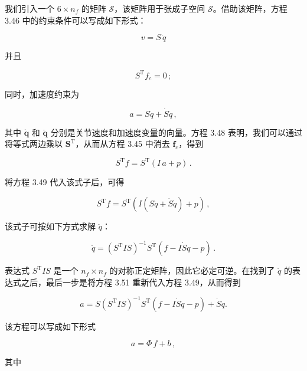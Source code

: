 \documentclass[10pt,a4paper]{book}
\theoremstyle{thmstyle} %
\theoremstyle{defstyle} %
\theoremstyle{prostyle} %
\begin{document}
我们引入一个 $6 \times n_{f}$ 的矩阵 $\mathcal{S}$，该矩阵用于张成子空间 $\mathcal{S}$。借助该矩阵，方程 3.46 中的约束条件可以写成如下形式：



$$
v = S \, \dot { q }
$$



并且



$$
S ^{\mathrm { T} } f _ { c } = 0 \, ;
$$



同时，加速度约束为



$$
a = S \ddot { q } + \dot { S } \dot { q } \, ,
$$



其中 $\dot{\boldsymbol{q}}$ 和 $\ddot{\boldsymbol{q}}$ 分别是关节速度和加速度变量的向量。方程 3.48 表明，我们可以通过将等式两边乘以 $\boldsymbol{S}^{\mathrm{T}}$，从而从方程 3.45 中消去 $\boldsymbol{f}_{c}$，得到



$$
S ^{\mathrm { T} } f = S ^{\mathrm { T} } ( I \, a + p ) \, .
$$



将方程 3.49 代入该式子后，可得



$$
S ^{\mathrm { T} } f = S ^{\mathrm { T} } ( I \left( S \ddot { q } + \dot { S } \dot { q } \right) + p ) \, ,
$$



该式子可按如下方式求解 $\ddot{q}$：



$$
\ddot { q } = ( S ^{\mathrm { T} } I S ) ^{- 1} S ^{\mathrm { T} } ( f - I \dot { S } \dot { q } - p ) \, .
$$



表达式 $S^{\mathrm{T}}IS$ 是一个 $n_{f} \times n_{f}$ 的对称正定矩阵，因此它必定可逆。在找到了 $\ddot{q}$ 的表达式之后，最后一步是将方程 3.51 重新代入方程 3.49，从而得到



$$
a = S \left( S ^{\mathrm { T} } I S \right) ^{- 1} S ^{\mathrm { T} } ( f - I \dot { S } \dot { q } - p ) + \dot { S } \dot { q } .
$$



该方程可以写成如下形式



$$
a = \Phi \, f + b \, ,
$$



其中
\end{document}
